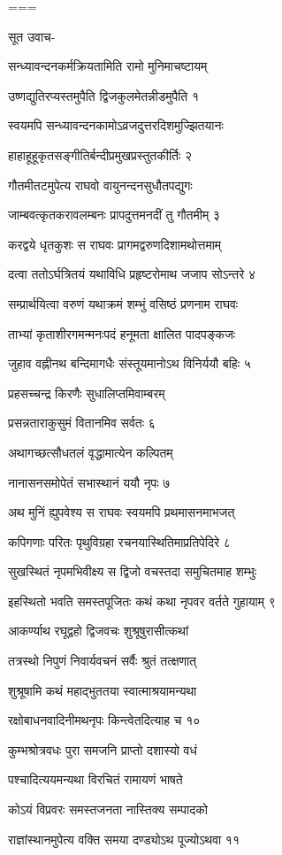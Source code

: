 ===





सूत उवाच-

सन्ध्यावन्दनकर्मक्रियतामिति रामो मुनिमाचष्टायम्

उष्णद्युतिरप्यस्तमुपैति द्विजकुलमेतन्नीडमुपैति १

स्वयमपि सन्ध्यावन्दनकामोऽव्रजदुत्तरदिशमुज्झितयानः

हाहाहूहूकृतसङ्गीतिर्बन्दीप्रमुखप्रस्तुतकीर्तिः २

गौतमीतटमुपेत्य राघवो वायुनन्दनसुधौतपद्युगः

जाम्बवत्कृतकरावलम्बनः प्रापदुत्तमनदीं तु गौतमीम् ३

करद्वये धृतकुशः स राघवः प्रागमद्वरुणदिशामथोत्तमाम्

दत्वा ततोऽर्घत्रितयं यथाविधि प्रहृष्टरोमाथ जजाप सोऽन्तरे ४

सम्प्रार्थयित्वा वरुणं यथाक्रमं शम्भुं वसिष्ठं प्रणनाम राघवः

ताभ्यां कृताशीरगमन्मनःपदं हनूमता क्षालित पादपङ्कजः

जुहाव वह्नीनथ बन्दिमागधैः संस्तूयमानोऽथ विनिर्ययौ बहिः ५

प्रहसच्चन्द्र किरणैः सुधालिप्तमिवाम्बरम्

प्रसन्नताराकुसुमं वितानमिव सर्वतः ६

अथागच्छत्सौधतलं वृद्धामात्येन कल्पितम्

नानासनसमोपेतं सभास्थानं ययौ नृपः ७

अथ मुनिं ह्युपवेश्य स राघवः स्वयमपि प्रथमासनमाभजत्

कपिगणाः परितः पृथुविग्रहा रचनयास्थितिमाप्रतिपेदिरे ८

सुखस्थितं नृपमभिवीक्ष्य स द्विजो वचस्तदा समुचितमाह शम्भुः

इहस्थितो भवति समस्तपूजितः कथं कथा नृपवर वर्तते गुहायाम् ९

आकर्ण्याथ रघूद्वहो द्विजवचः शुश्रूषुरासीत्कथां

तत्रस्थो निपुणं निवार्यवचनं सर्वैः श्रुतं तत्क्षणात्

शुश्रूषामि कथं महाद्भुततया स्वात्माश्रयामन्यथा

रक्षोबाधनवादिनीमथनृपः किन्त्वेतदित्याह च १०

कुम्भश्रोत्रवधः पुरा समजनि प्राप्तो दशास्यो वधं

पश्चादित्ययमन्यथा विरचितं रामायणं भाषते

कोऽयं विप्रवरः समस्तजनता नास्तिक्य सम्पादको

राज्ञांस्थानमुपेत्य वक्ति समया दण्ड्योऽथ पूज्योऽथवा ११

